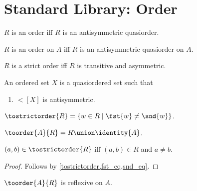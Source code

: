 \section{Standard Library: Order}

\begin{abbreviation}\label{order}
    $R$ is an order iff
        $R$ is an antisymmetric quasiorder.
\end{abbreviation}

\begin{abbreviation}\label{order_on}
    $R$ is an order on $A$ iff
        $R$ is an antisymmetric quasiorder on $A$.
\end{abbreviation}

\begin{abbreviation}\label{strictorder}
    $R$ is a strict order iff
        $R$ is transitive and asymmetric.
\end{abbreviation}

\begin{struct}\label{orderedset}
    An ordered set $X$ is a quasiordered set
    such that
    \begin{enumerate}
        \item\label{orderedset_antisym} $\lt[X]$ is antisymmetric.
    \end{enumerate}
\end{struct}

\begin{definition}\label{tostrictorder}
    $\tostrictorder{R} = \{w\in R\mid \fst{w}\neq\snd{w}\}$.
\end{definition}

\begin{definition}\label{toorder}
    $\toorder{A}{R} = R\union\identity{A}$.
\end{definition}

\begin{proposition}\label{tostrictorder_iff}
    $(a,b)\in\tostrictorder{R}$ iff $(a,b)\in R$ and $a\neq b$.
\end{proposition}
\begin{proof}
    Follows by \cref{tostrictorder,fst_eq,snd_eq}.
\end{proof}

\begin{proposition}\label{toorder_reflexive}
    $\toorder{A}{R}$ is reflexive on $A$.
\end{proposition}

